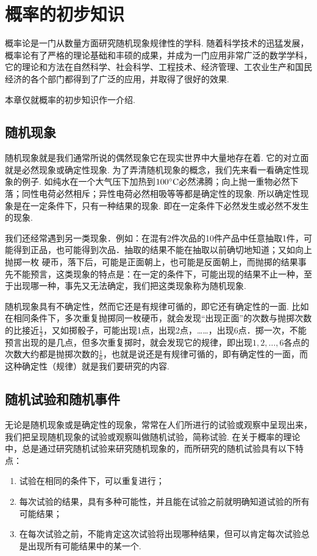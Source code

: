 \chapter{概率的初步知识}
概率论是一门从数量方面研究随机现象规律性的学科. 随着科学技术的迅猛发展，概率论有了严格的理论基础和丰硕的成果，并成为一门应用非常广泛的数学学科，它的理论和方法在自然科学、社会科学、工程技术、经济管理、工农业生产和国民经济的各个部门都得到了广泛的应用，并取得了很好的效果. 

本章仅就概率的初步知识作一介绍. 

\section{随机现象}
随机现象就是我们通常所说的偶然现象它在现实世界中大量地存在着. 它的对立面就是必然现象或确定性现象. 为了弄清随机现象的概念，我们先来看一看确定性现象的例子. 如纯水在一个大气压下加热到$100^{\circ}{\rm C}$必然沸腾；向上抛一重物必然下落；同性电荷必然相斥；异性电荷必然相吸等等都是确定性的现象. 所以确定性现象是在一定条件下，只有一种结果的现象. 即在一定条件下必然发生或必然不发生的现象. 

我们还经常遇到另一类现象．例如：在混有2件次品的10件产品中任意抽取1件，可能得到正品，也可能得到次品．抽取的结果不能在抽取以前确切地知道；又如向上抛掷一枚
硬币，落下后，可能是正面朝上，也可能是反面朝上，而抛掷的结果事先不能预言，这类现象的特点是：在一定的条件下，可能出现的结果不止一种，至于出现哪一种，事先又无法确定，我们把这类现象称为随机现象. 

随机现象具有不确定性，然而它还是有规律可循的，即它还有确定性的一面. 比如在相同条件下，多次重复抛掷同一枚硬币，就会发现“出现正面”的次数与抛掷次数的比接近$\frac{1}{2}$，又如掷骰子，可能出现1点，出现2点，……，出现6点．掷一次，不能预言出现的是几点，但多次重复掷时，就会发现它的规律，即出现$1,2,\ldots,6$各点的次数大约都是抛掷次数的$\frac{1}{6}$，也就是说还是有规律可循的，即有确定性的一面，而这种确定性（规律）就是我们要研究的内容. 

\section{随机试验和随机事件}

无论是随机现象或是确定性的现象，常常在人们所进行的试验或观察中呈现出来，我们把呈现随机现象的试验或观察叫做随机试验，简称试验. 在关于概率的理论中，总是通过研究随机试验来研究随机现象的，而所研究的随机试验具有以下特点：
\begin{enumerate}
\item 试验在相同的条件下，可以重复进行；
\item 每次试验的结果，具有多种可能性，并且能在试验之前就明确知道试验的所有可能结果；
\item 在每次试验之前，不能肯定这次试验将出现哪种结果，但可以肯定每次试验总是出现所有可能结果中的某一个. 
\end{enumerate}

